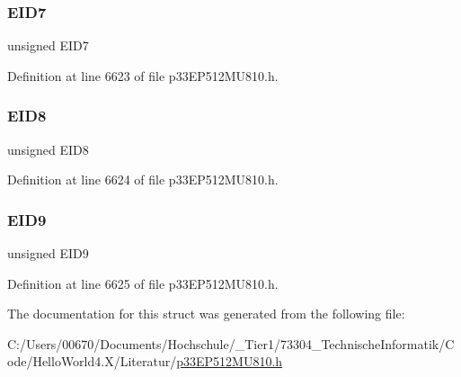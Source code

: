 \subsubsection{\texorpdfstring{E\+I\+D7}{EID7}}
{\footnotesize\ttfamily unsigned E\+I\+D7}



Definition at line 6623 of file p33\+E\+P512\+M\+U810.\+h.

\mbox{\label{structtag_c2_r_x_f7_e_i_d_b_i_t_s_acca25e0b7d86eb499d01f85222baea87}} 
\subsubsection{\texorpdfstring{E\+I\+D8}{EID8}}
{\footnotesize\ttfamily unsigned E\+I\+D8}



Definition at line 6624 of file p33\+E\+P512\+M\+U810.\+h.

\mbox{\label{structtag_c2_r_x_f7_e_i_d_b_i_t_s_ac6748f73d4ada8538b06548be4f396c2}} 
\subsubsection{\texorpdfstring{E\+I\+D9}{EID9}}
{\footnotesize\ttfamily unsigned E\+I\+D9}



Definition at line 6625 of file p33\+E\+P512\+M\+U810.\+h.



The documentation for this struct was generated from the following file\+:\begin{DoxyCompactItemize}
\item 
C\+:/\+Users/00670/\+Documents/\+Hochschule/\+\_\+\+Tier1/73304\+\_\+\+Technische\+Informatik/\+Code/\+Hello\+World4.\+X/\+Literatur/\hyperlink{p33_e_p512_m_u810_8h}{p33\+E\+P512\+M\+U810.\+h}\end{DoxyCompactItemize}
